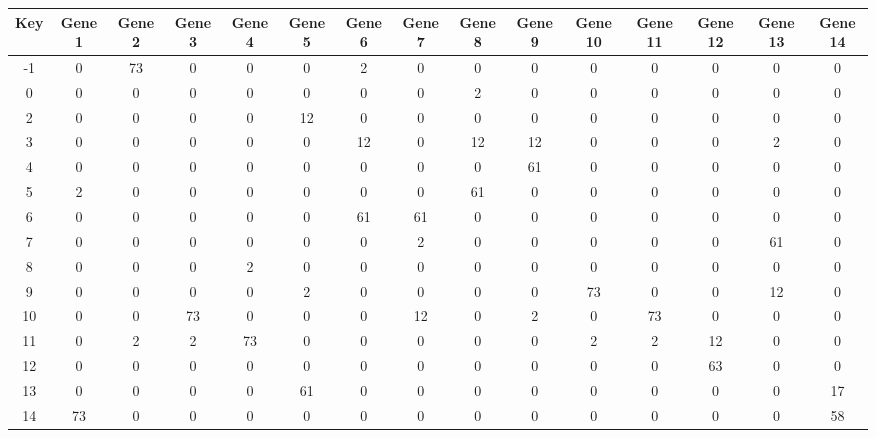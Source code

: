 \begin{tabular}{|c|c|c|c|c|c|c|c|c|c|c|c|c|c|c|}
\hline
Key & Gene 1 & Gene 2 & Gene 3 & Gene 4 & Gene 5 & Gene 6 & Gene 7 & Gene 8 & Gene 9 & Gene 10 & Gene 11 & Gene 12 & Gene 13 & Gene 14 \\
\hline
-1 & 0 & 73 & 0 & 0 & 0 & 2 & 0 & 0 & 0 & 0 & 0 & 0 & 0 & 0 \\
0 & 0 & 0 & 0 & 0 & 0 & 0 & 0 & 2 & 0 & 0 & 0 & 0 & 0 & 0 \\
2 & 0 & 0 & 0 & 0 & 12 & 0 & 0 & 0 & 0 & 0 & 0 & 0 & 0 & 0 \\
3 & 0 & 0 & 0 & 0 & 0 & 12 & 0 & 12 & 12 & 0 & 0 & 0 & 2 & 0 \\
4 & 0 & 0 & 0 & 0 & 0 & 0 & 0 & 0 & 61 & 0 & 0 & 0 & 0 & 0 \\
5 & 2 & 0 & 0 & 0 & 0 & 0 & 0 & 61 & 0 & 0 & 0 & 0 & 0 & 0 \\
6 & 0 & 0 & 0 & 0 & 0 & 61 & 61 & 0 & 0 & 0 & 0 & 0 & 0 & 0 \\
7 & 0 & 0 & 0 & 0 & 0 & 0 & 2 & 0 & 0 & 0 & 0 & 0 & 61 & 0 \\
8 & 0 & 0 & 0 & 2 & 0 & 0 & 0 & 0 & 0 & 0 & 0 & 0 & 0 & 0 \\
9 & 0 & 0 & 0 & 0 & 2 & 0 & 0 & 0 & 0 & 73 & 0 & 0 & 12 & 0 \\
10 & 0 & 0 & 73 & 0 & 0 & 0 & 12 & 0 & 2 & 0 & 73 & 0 & 0 & 0 \\
11 & 0 & 2 & 2 & 73 & 0 & 0 & 0 & 0 & 0 & 2 & 2 & 12 & 0 & 0 \\
12 & 0 & 0 & 0 & 0 & 0 & 0 & 0 & 0 & 0 & 0 & 0 & 63 & 0 & 0 \\
13 & 0 & 0 & 0 & 0 & 61 & 0 & 0 & 0 & 0 & 0 & 0 & 0 & 0 & 17 \\
14 & 73 & 0 & 0 & 0 & 0 & 0 & 0 & 0 & 0 & 0 & 0 & 0 & 0 & 58 \\
\hline
\end{tabular}